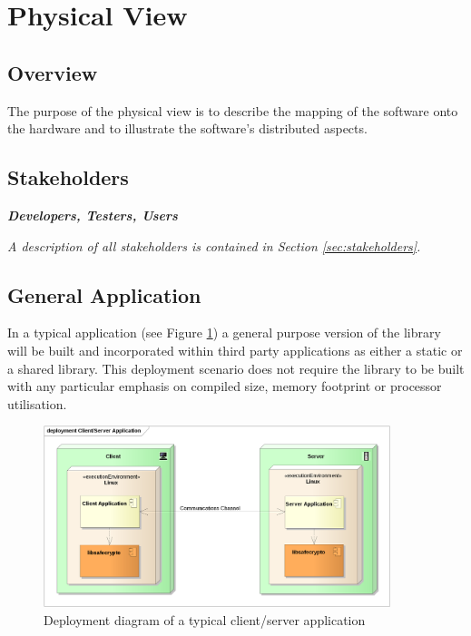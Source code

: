 \section{Physical View}
\label{sec_deployment}


\subsection{Overview}

The purpose of the physical view is to describe the mapping of the software onto the hardware and to illustrate the software's distributed aspects.


\subsection{Stakeholders}

\textbf{\textit{Developers, Testers, Users}}

\textit{A description of all stakeholders is contained in Section \ref{sec:stakeholders}.}


\subsection{General Application}

In a typical application (see Figure \ref{fig:deployment_client_server}) a general purpose version of the library will be built and incorporated within third party applications as either a static or a shared library. This deployment scenario does not require the library to be built with any particular emphasis on compiled size, memory footprint or processor utilisation.

\begin{figure}[H]
\centering
\includegraphics[width=0.9\textwidth]{simple_deployment_client_server.png}
\caption{Deployment diagram of a typical client/server application}
\label{fig:deployment_client_server}
\end{figure}

